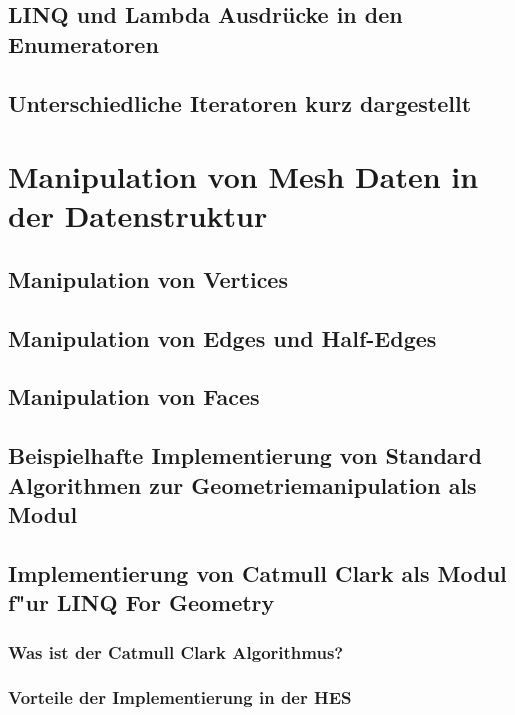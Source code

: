 \documentclass[12pt,a4paper]{scrreprt}
\newcommand{\LFG}{LINQ For Geometry}
\begin{document}
		\subsection {LINQ und Lambda Ausdrücke in den Enumeratoren}
		\subsection {Unterschiedliche Iteratoren kurz dargestellt}
	\section {Manipulation von Mesh Daten in der Datenstruktur}
		\subsection {Manipulation von Vertices}
		\subsection {Manipulation von Edges und Half-Edges}
		\subsection {Manipulation von Faces}
		\subsection {Beispielhafte Implementierung von Standard Algorithmen zur Geometriemanipulation als Modul}
		\subsection {Implementierung von Catmull Clark als Modul f"ur \LFG}
			\subsubsection {Was ist der Catmull Clark Algorithmus?}
			\subsubsection {Vorteile der Implementierung in der HES}

\end{document}

